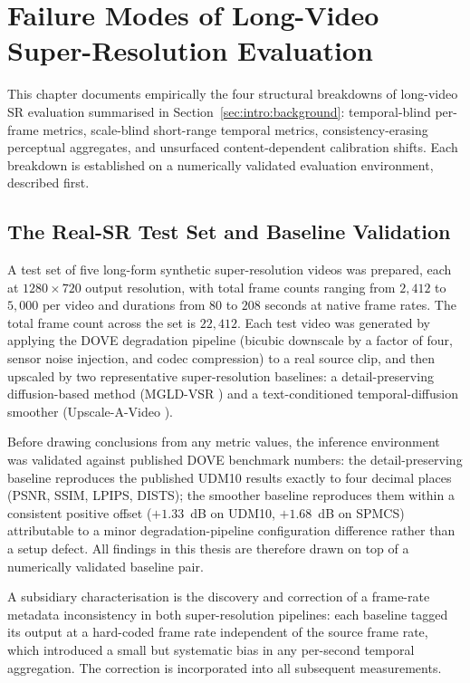 \chapter{Failure Modes of Long-Video Super-Resolution Evaluation}
\label{ch:problem}

This chapter documents empirically the four structural breakdowns of long-video SR
evaluation summarised in Section~\ref{sec:intro:background}: temporal-blind per-frame
metrics, scale-blind short-range temporal metrics, consistency-erasing perceptual
aggregates, and unsurfaced content-dependent calibration shifts. Each breakdown is
established on a numerically validated evaluation environment, described first.

\section{The Real-SR Test Set and Baseline Validation}
\label{sec:problem:testset}

A test set of five long-form synthetic super-resolution videos was prepared, each at
$1280 \times 720$ output resolution, with total frame counts ranging from $2{,}412$ to
$5{,}000$ per video and durations from $80$ to $208$ seconds at native frame rates. The
total frame count across the set is $22{,}412$. Each test video was generated by applying
the DOVE \cite{yang_dove_2024} degradation pipeline (bicubic downscale by a factor of
four, sensor noise injection, and codec compression) to a real source clip, and then
upscaled by two representative super-resolution baselines: a detail-preserving
diffusion-based method (MGLD-VSR \cite{he_mgld_2024}) and a text-conditioned
temporal-diffusion smoother (Upscale-A-Video \cite{zhou_upscale_2024}).

Before drawing conclusions from any metric values, the inference environment was
validated against published DOVE benchmark numbers: the detail-preserving baseline
reproduces the published UDM10 results exactly to four decimal places (PSNR, SSIM,
LPIPS, DISTS); the smoother baseline reproduces them within a consistent positive offset
($+1.33$~dB on UDM10, $+1.68$~dB on SPMCS) attributable to a minor degradation-pipeline
configuration difference rather than a setup defect. All findings in this thesis are
therefore drawn on top of a numerically validated baseline pair.

A subsidiary characterisation is the discovery and correction of a frame-rate metadata
inconsistency in both super-resolution pipelines: each baseline tagged its output at a
hard-coded frame rate independent of the source frame rate, which introduced a small but
systematic bias in any per-second temporal aggregation. The correction is incorporated
into all subsequent measurements.

